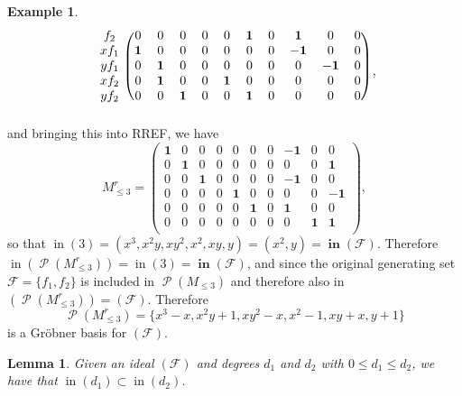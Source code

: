 \documentclass[11pt]{article}
\newcommand{\F}{\mathcal{F}}
\DeclareMathOperator{\Poly}{\mathscr{P}}
\DeclareMathOperator{\init}{in}
\DeclareMathOperator{\Init}{\mathbf{in}}
\newtheorem{lemma}{Lemma}
\theoremstyle{definition}
\newtheorem{example}{Example}
\begin{document}
\begin{example}
\[\begin{blockarray}{ccccccccccc}
\begin{block}{c(cccccccccc)}
	        f_2 & 0 & 0 & 0 & 0 & 0 & \mathbf{1} & 0 & \mathbf{1} & 0 & 0 \\
	        xf_1 & \mathbf{1} & 0 & 0 & 0 & 0 & 0 & 0 & \mathbf{-1} & 0 & 0 \\
	        yf_1 & 0 & \mathbf{1} & 0 & 0 & 0 & 0 & 0 & 0 & \mathbf{-1} & 0 \\
	        xf_2 & 0 & \mathbf{1} & 0 & 0 & \mathbf{1} & 0 & 0 & 0 & 0 & 0 \\
	        yf_2 & 0 & 0 & \mathbf{1} & 0 & 0 & \mathbf{1} & 0 & 0 & 0 & 0 \\
	    \end{block}
	\end{blockarray} \,\,, \] and bringing this into RREF, we have \[ M_{\leq 3}^r = \begin{pmatrix}
		\mathbf{1} & 0 & 0 & 0 & 0 & 0 & 0 & \mathbf{-1} & 0 & 0 \\
		0 & \mathbf{1} & 0 & 0 & 0 & 0 & 0 & 0 & 0 & \mathbf{1} \\
		0 & 0 & \mathbf{1} & 0 & 0 & 0 & 0 & \mathbf{-1} & 0 & 0 \\
		0 & 0 & 0 & 0 & \mathbf{1} & 0 & 0 & 0 & 0 & \mathbf{-1} \\
		0 & 0 & 0 & 0 & 0 & \mathbf{1} & 0 & \mathbf{1} & 0 & 0 \\
		0 & 0 & 0 & 0 & 0 & 0 & 0 & 0 & \mathbf{1} & \mathbf{1} \\
	\end{pmatrix}, \] so that $\init(3) = (x^3, x^2y, xy^2, x^2, xy, y) = (x^2, y) = \Init(\F)$. Therefore $\init(\Poly(M_{\leq 3}^r)) = \init(3) = \Init(
	\F)$, and since the original generating set $
	\F = \{f_1, f_2\}$ is included in $\Poly(M_{\leq 3})$ and therefore also in $(\Poly(M_{\leq 3}^r)) = (\F)$. Therefore \[ \Poly(M_{\leq 3}^r) = \{x^3 - x, x^2y + 1, xy^2 - x, x^2 - 1, xy + x, y + 1\} \] is a Gröbner basis for $(\F)$. 
\end{example}


\begin{lemma}
	Given an ideal $(\F)$ and degrees $d_1$ and $d_2$ with $0 \leq d_1 \leq d_2$, we have that $\init(d_1) \subset \init(d_2)$. 
\end{lemma}
\end{document}
